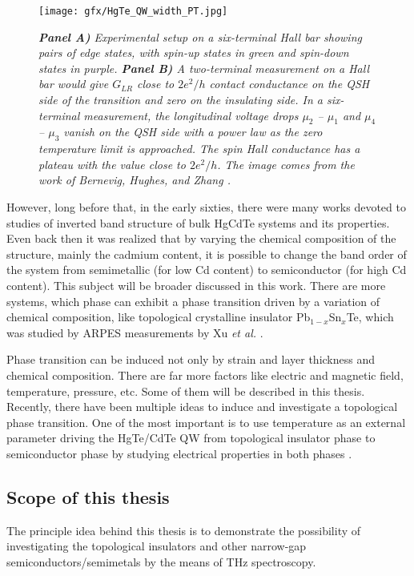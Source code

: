 \documentclass[titlepage,a4paper]{book}
\newcommand{\wciecie}{\quad\phantom{v}}
\begin{document}
\begin{figure}[ht]
	\centering
	\texttt{[image: gfx/HgTe\_QW\_width\_PT.jpg]}
	\vspace{-10pt}
	\caption{\textit{\textbf{Panel A)} Experimental setup on a six-terminal Hall bar showing pairs of edge states, with spin-up states in green and spin-down states in purple. \textbf{Panel B)} A two-terminal measurement on a Hall bar would give $G_{LR}$ close to $2e^2/h$ contact conductance on the QSH side of the transition and zero on the insulating side. In a six-terminal measurement, the longitudinal voltage drops $\mu_2$ -- $\mu_1$ and $\mu_4$ -- $\mu_3$ vanish on the QSH side with a power law as the zero temperature limit is approached. The spin Hall conductance has a plateau with the value close to $2e^2/h$. The image comes from the work of Bernevig, Hughes, and Zhang \cite{Bernevig_Topology2}.}}
	\label{fig:HgTe_QW_width_PT}
\end{figure} 

However, long before that, in the early sixties, there were many works devoted to studies of inverted band structure of bulk HgCdTe systems and its properties. Even back then it was realized that by varying the chemical composition of the structure, mainly the cadmium content, it is possible to change the band order of the system from semimetallic (for low Cd content) to semiconductor (for high Cd content). This subject will be broader discussed in this work. There are more systems, which phase can exhibit a phase transition driven by a variation of chemical composition, like topological crystalline insulator Pb$_{1-x}$Sn$_{x}$Te, which was studied by ARPES measurements by Xu \textit{et al.} \cite{Xu_CTI}.

Phase transition can be induced not only by strain and layer thickness and chemical composition. There are far more factors like electric and magnetic field, temperature, pressure, etc. Some of them will be described in this thesis. Recently, there have been multiple ideas to induce and investigate a topological phase transition. One of the most important is to use temperature as an external parameter driving the HgTe/CdTe QW from topological insulator phase to semiconductor phase by studying electrical properties in both phases \cite{Wiedmann_State}. 

\subsection{Scope of this thesis}
\wciecie
The principle idea behind this thesis is to demonstrate the possibility of investigating the topological insulators and other narrow-gap semiconductors/semimetals by the means of THz spectroscopy. 
\end{document}
